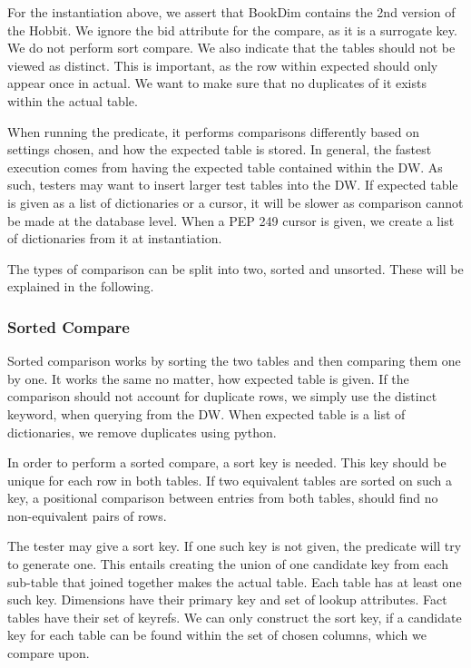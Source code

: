 For the instantiation above, we assert that BookDim contains the 2nd version of the Hobbit. We ignore the bid attribute for the compare, as it is a surrogate key. We do not perform sort compare. We also indicate that the tables should not be viewed as distinct. This is important, as the row within expected should only appear once in actual. We want to make sure that no duplicates of it exists within the actual table.

When running the predicate, it performs comparisons differently based on settings chosen, and how the expected table is stored. In general, the fastest execution comes from having the expected table contained within the DW. As such, testers may want to insert larger test tables into the DW. If expected table is given as a list of dictionaries or a cursor, it will be slower as comparison cannot be made at the database level. When a PEP 249 cursor is given, we create a list of dictionaries from it at instantiation.

The types of comparison can be split into two, sorted and unsorted. These will be explained in the following.

\subsubsection{Sorted Compare}
Sorted comparison works by sorting the two tables and then comparing them one by one. It works the same no matter, how expected table is given. If the comparison should not account for duplicate rows, we simply use the distinct keyword, when querying from the DW. When expected table is a list of dictionaries, we remove duplicates using python.

In order to perform a sorted compare, a sort key is needed. This key should be unique for each row in both tables. If two equivalent tables are sorted on such a key, a positional comparison between entries from both tables, should find no non-equivalent pairs of rows.

The tester may give a sort key. If one such key is not given, the predicate will try to generate one. This entails creating the union of one candidate key from each sub-table that joined together makes the actual table. Each table has at least one such key. Dimensions have their primary key and set of lookup attributes. Fact tables have their set of keyrefs. We can only construct the sort key, if a candidate key for each table can be found within the set of chosen columns, which we compare upon.


